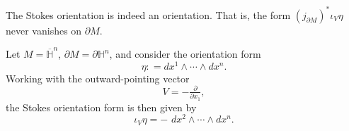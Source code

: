 \documentclass{ximera}
\begin{document}
\begin{proposition}
    The Stokes orientation is indeed an orientation. That is, the form $ ( j_{\partial M} ) ^{\ast} \iota _V \eta $ never vanishes on $\partial M$. 
\end{proposition}


\begin{example}
Let $M = \overline{\mathbb{H}}^n$, $\partial M = \partial \mathbb{H}^n$, and consider the orientation form 
\[     \eta : = dx^1 \wedge \cdots \wedge dx^n  .          \]
Working with the outward-pointing vector 
\[      V = - \tfrac{\partial }{\partial x_1} ,       \]
the Stokes orientation form is then given by 
\[   \iota _V \eta =  - \,\, dx^2 \wedge \cdots \wedge dx^n  .       \]
\end{example}
\end{document}
